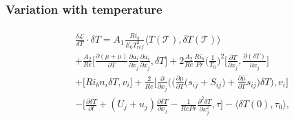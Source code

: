 \documentclass[preprint,12pt]{article}
\begin{document}
\subsubsection*{Variation with temperature}
\begin{align}\begin{split}
&\frac{\delta \mathcal{L}}{\delta T}\cdot \delta T=A_1\frac{Ri_b}{E_0T_{ref}^2}\Big\langle T(\mathcal{T}),\delta T(\mathcal{T}) \Big\rangle\\&+\frac{A_2}{Re}\bigg[\frac{\partial (\mu+\overline{\mu})}{\partial T}\frac{\partial u_{i}}{\partial x_j}\frac{\partial u_{i}}{\partial x_j},\delta T\bigg]+2\frac{A_2}{Re}\frac{Ri_b}{Pr}\Big(\frac{1}{T_0}\Big)^2\bigg[\frac{\partial T}{\partial x_j},\frac{\partial (\delta T)}{\partial x_j}\bigg]\\&+\bigg[Ri_bn_i\delta T,v_i\bigg]+\frac{2}{Re}\Bigg[{\frac{\partial}{\partial x_j}}\Big(\Big(\frac{\partial\mu}{\partial T}\big(s_{ij}+S_{ij}\big)+\frac{\partial\bar{\mu}}{\partial T}s_{ij}\Big) \delta T\Big),v_i\Bigg]\\&-\Bigg[\frac{\partial{\delta T}}{\partial{t}}+(U_j+u_j)\frac{\partial \delta T}{\partial x_j} -\frac{1}{{Re }Pr} \frac{\partial^2\delta T}{\partial x_j^2},\tau\Bigg]-\langle \delta T(0),\tau_0 \rangle,
\end{split}\end{align}
\end{document}

